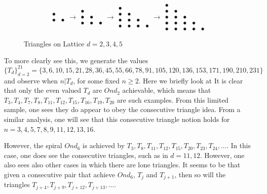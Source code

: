 \documentclass[11pt,reqno]{amsart}
\theoremstyle{mydef}
\begin{document}
\begin{figure}[h]
\[  \begin{array}{cc}
\bullet & \ \\
\bullet & \bullet
\end{array} 
\rightarrow
%
\begin{array}{ccc}
\bullet & \  & \ \\
\bullet & \bullet \\
\bullet & \bullet & \bullet 
\end{array}
\rightarrow
\begin{array}{cccc}
\bullet & \  & \  & \  \\
\bullet & \bullet & \  & \  \\
\bullet & \bullet & \bullet & \  \\
\bullet & \bullet & \bullet & \bullet
\end{array}
\rightarrow
\begin{array}{ccccc}
\bullet & \  & \  & \  & \  \\
\bullet & \bullet & \   & \  & \  \\
\bullet & \bullet & \bullet  & \ & \  \\
\bullet & \bullet & \bullet & \bullet & \  \\
\bullet & \bullet & \bullet & \bullet & \bullet
\end{array}
\]
\caption{Triangles on Lattice $d = 2, 3, 4, 5$}
\label{fig:trianglegrowth}
\end{figure}

To more clearly see this, we generate the values 
\[
	\{ T_d \}_{d=2}^{21} = \{ 3, 6, 10, 15, 21, 28,   36, 45, 55, 66, 78,   91, 105, 120, 136, 153, 171,190,210,231 \}
\]
and observe when $n \vert T_d$, for some fixed $n \ge 2$. Here we briefly look at It is clear that only the even valued $T_d$ are $Ond_2$
achievable, which means that $T_3, T_4, T_7, T_8, T_{11}, T_{12}, T_{15}, T_{16},  T_{19}, T_{20}$ are such 
examples. From this limited sample, one sees they do appear to obey the consecutive triangle idea. From a  similar
analysis, one will see that this consecutive triangle notion holds for $n = 3, 4, 5, 7, 8, 9, 11, 12, 13, 16$.

However, the spiral $Ond_6$ is achieved by $T_3, T_8, T_{11}, T_{12}, T_{15}, T_{20}, T_{23}, T_{24}, \ldots$. In this
case,  one does see the  consecutive triangles, such as in $d = 11, 12$. However, one also sees also other cases in
which there are lone triangles. It seems to be that given a consecutive pair that achieve $Ond_6$, $T_j$ and $T_{j+1}$, 
then so will the triangles $T_{j+4}, T_{j+9}, T_{j+12}, T_{j+13}, \ldots$.
\end{document}

